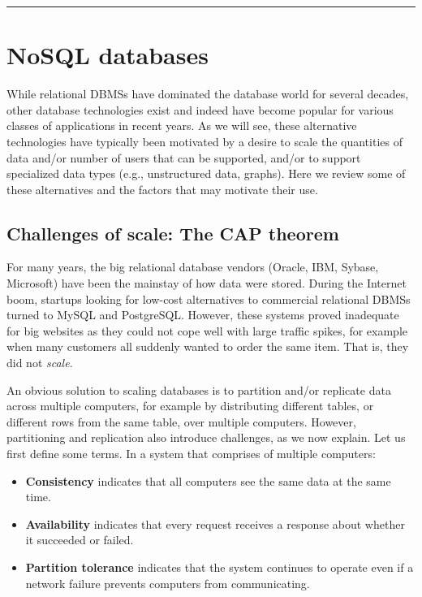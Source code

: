 \documentclass[]{krantz}
\begin{document}
\begin{center}\rule{0.5\linewidth}{\linethickness}\end{center}

\hypertarget{sec:db:nosql}{\section{NoSQL
databases}\label{sec:db:nosql}}

While relational DBMSs have dominated the database world for several
decades, other database technologies exist and indeed have become
popular for various classes of applications in recent years. As we will
see, these alternative technologies have typically been motivated by a
desire to scale the quantities of data and/or number of users that can
be supported, and/or to support specialized data types (e.g.,
unstructured data, graphs). Here we review some of these alternatives
and the factors that may motivate their use.

\subsection{Challenges of scale: The CAP
theorem}\label{challenges-of-scale-the-cap-theorem}

For many years, the big relational database vendors (Oracle, IBM,
Sybase, Microsoft) have been the mainstay of how data were stored.
During the Internet boom, startups looking for low-cost alternatives to
commercial relational DBMSs turned to MySQL and PostgreSQL. However,
these systems proved inadequate for big websites as they could not cope
well with large traffic spikes, for example when many customers all
suddenly wanted to order the same item. That is, they did not
\emph{scale}.

An obvious solution to scaling databases is to partition and/or
replicate data across multiple computers, for example by distributing
different tables, or different rows from the same table, over multiple
computers. However, partitioning and replication also introduce
challenges, as we now explain. Let us first define some terms. In a
system that comprises of multiple computers:

\begin{itemize}
\item
  \textbf{Consistency} indicates that all computers see the same data at
  the same time.
\item
  \textbf{Availability} indicates that every request receives a response
  about whether it succeeded or failed.
\item
  \textbf{Partition tolerance} indicates that the system continues to
  operate even if a network failure prevents computers from
  communicating.
\end{itemize}
\end{document}

